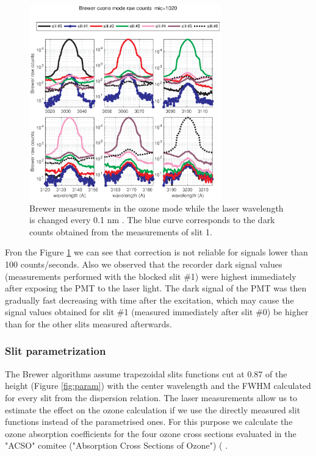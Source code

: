 \documentclass[acp, manuscript]{copernicus}
\begin{document}
%
\begin{figure}[t]
\includegraphics[width=8.3cm]{figures/General_laser_log.eps}
\caption{Brewer measurements in the ozone mode while the laser wavelength is changed every 0.1 nm . The blue curve corresponds to the dark counts obtained from the measurements of slit 1.}
\label{fig:laser_log}
\end{figure}

Fron the Figure \ref{fig:laser_log} we can see that correction is not reliable for signals lower than 100 counts/seconds. Also we observed that the recorder dark signal values (measurements performed with the blocked slit \#1) were highest immediately after exposing the PMT to the laser light. The dark signal of the PMT was then gradually fast decreasing with time after the excitation, which may cause the signal values obtained for slit \#1 (measured immediately after slit \#0) be higher than for the other slits measured afterwards.

\subsubsection{Slit parametrization }

The Brewer algorithms assume trapezoidal slits functions cut at 0.87 of the height (Figure \ref{fig:param}) with the  center wavelength and the FWHM calculated for every slit from the dispersion relation. The laser measurements allow us to estimate the effect on the ozone calculation if we use the directly measured slit functions instead of the parametrised ones. For this purpose we calculate the ozone absorption coefficients for the four ozone cross sections evaluated in the  "ACSO" comitee ("Absorption Cross Sections of Ozone") ( \citet{orphal2016absorption}.
\end{document}
